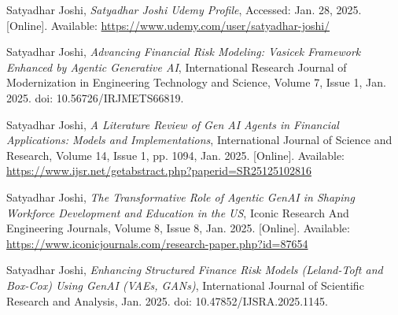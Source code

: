 \documentclass[a4paper,headinclude=on,footinclude=on,12pt,oneside]{scrbook}
\begin{document}
\begin{thebibliography}{14}
	Satyadhar Joshi, 
	\textit{Satyadhar Joshi Udemy Profile}, 
	Accessed: Jan. 28, 2025. [Online]. Available: \url{https://www.udemy.com/user/satyadhar-joshi/}
	
	
	
	
	
	
	
	
	
	
		
	Satyadhar Joshi, 
	\textit{Advancing Financial Risk Modeling: Vasicek Framework Enhanced by Agentic Generative AI}, 
	International Research Journal of Modernization in Engineering Technology and Science, Volume 7, Issue 1, Jan. 2025. doi: 10.56726/IRJMETS66819.
	

	
	Satyadhar Joshi, 
	\textit{A Literature Review of Gen AI Agents in Financial Applications: Models and Implementations}, 
	International Journal of Science and Research, Volume 14, Issue 1, pp. 1094, Jan. 2025. [Online]. Available: \url{https://www.ijsr.net/getabstract.php?paperid=SR25125102816}
	
	Satyadhar Joshi, 
	\textit{The Transformative Role of Agentic GenAI in Shaping Workforce Development and Education in the US}, 
	Iconic Research And Engineering Journals, Volume 8, Issue 8, Jan. 2025. [Online]. Available: \url{https://www.iconicjournals.com/research-paper.php?id=87654}
	
	Satyadhar Joshi, 
	\textit{Enhancing Structured Finance Risk Models (Leland-Toft and Box-Cox) Using GenAI (VAEs, GANs)}, 
	International Journal of Scientific Research and Analysis, Jan. 2025. doi: 10.47852/IJSRA.2025.1145.
	
	
	
	
	
	
	
	
	
\end{thebibliography}
\end{document}
